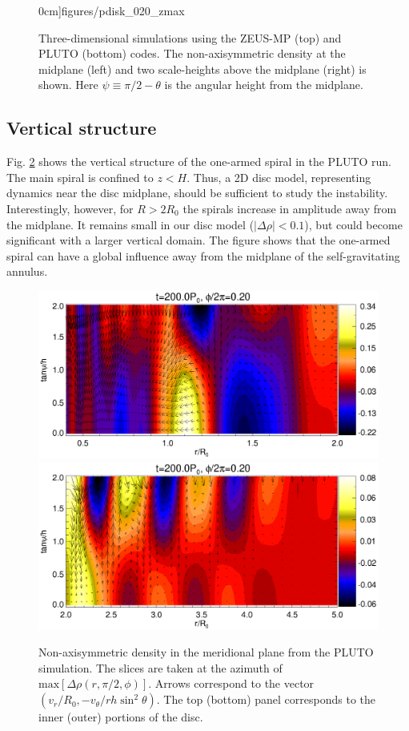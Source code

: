 \begin{figure}
\begin{center}
{      0cm]{figures/pdisk_020_zmax}
    }
  \end{center}
  \caption{Three-dimensional simulations using the ZEUS-MP (top) and 
    PLUTO (bottom) codes. The non-axisymmetric density at the midplane (left) and
    two scale-heights above the midplane (right) is shown. Here $\psi
    \equiv \pi/2 - \theta$ is the angular height  
    from the midplane.\label{3d_prelim}}   
\end{figure}

\subsection{Vertical structure}
Fig. \ref{3d_rz} shows the vertical structure of the one-armed
spiral in the PLUTO run. The main spiral is confined to $z < H$. Thus,
a 2D disc model, representing dynamics near the disc midplane, 
should be sufficient to study the instability. Interestingly, however, for $R>2R_0$ the
spirals  increase in amplitude away from the midplane. It remains
small in our disc model ($|\Delta\rho| < 0.1$), but could become 
significant with a larger vertical domain. The figure shows that 
the one-armed spiral can have a global influence away from the
midplane of the self-gravitating annulus.

\begin{figure}
  \includegraphics[scale=0.47,clip=true,trim=0cm 0.79cm 0cm 0cm]{figures/pdisk_rz_020_sg.ps}
  \includegraphics[scale=0.47,clip=true,trim=0cm 0cm 0cm 0.64cm]{figures/pdisk_rz_020_nsg.ps}
  \caption{Non-axisymmetric density in the meridional plane from the
    PLUTO simulation. The slices are taken at the azimuth of   
    $\mathrm{max}[\Delta\rho(r,\pi/2,\phi)]$. Arrows correspond to the vector 
    $(v_r/R_0,-v_\theta/rh\sin^2{\theta})$. The top (bottom) panel corresponds
    to the inner (outer) portions of the disc. 
    \label{3d_rz}} 
\end{figure}   

